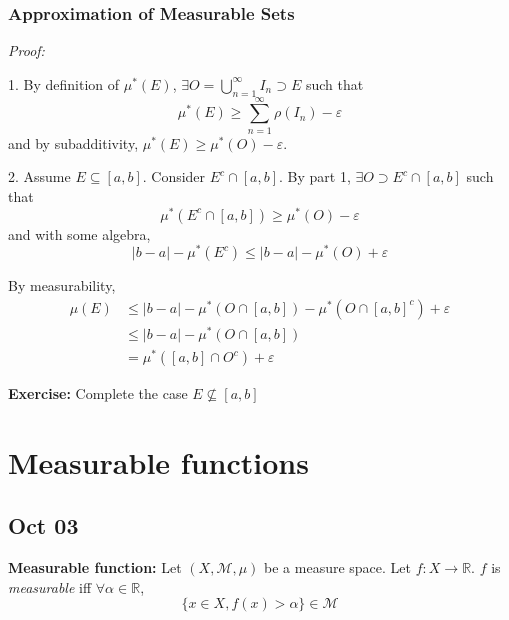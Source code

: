 \documentclass[12pt]{report}
\newcommand{\R}{\mathbb{R}}
\newcommand{\abs}[1]{\left\vert #1 \right\vert}
\newcommand{\ep}{\varepsilon}
\newcommand{\M}{\mathcal{M}}
\newcommand{\sub}{\subseteq}
\newenvironment*{tbox}[2][gray]{
    \begin{tcolorbox}[
        parbox=false,
        colback=#1!5!white,
        colframe=#1!75!black,
        breakable,
        title={#2}
    ]}
    {\end{tcolorbox}}
\newenvironment*{exercise}[1][red]{
    \begin{tcolorbox}[
        parbox=false,
        colback=#1!5!white,
        colframe=#1!75!black,
        breakable
    ]}
    {\end{tcolorbox}}
\begin{document}
\subsection*{Approximation of Measurable Sets}
    \begin{tbox}{\textbf{Lemma:} 
        \begin{enumerate}
            \item (Approximation from Above) $\forall E \sub P(X)$ and $\forall \ep > 0$, then exists an open set $O$ such that $E \sub O$ and 
            \[\mu(O) \geq \mu^*(E) \geq \mu(O) - \ep\]
            \item (Approximation from Below) $\forall E \sub \M$ and $\forall \ep > 0$, $\exists K$ closed such that 
            \[\mu(K) \leq \mu(E) \leq \mu(K) + \ep\] 
        \end{enumerate}}
        \emph{Proof:} 

        1. By definition of $\mu^*(E)$, $\exists O = \bigcup_{n=1}^\infty I_n \supset E$ such that 
        \[\mu^*(E) \geq \sum_{n=1}^{\infty} \rho(I_n) - \ep\] 
        and by subadditivity, $\mu^*(E) \geq \mu^*(O) - \ep$. 
        
        2. Assume $E \sub [a, b]$. Consider $E^c \cap [a, b]$. By part 1, $\exists O \supset E^c \cap [a, b]$ such that 
        \[\mu^*(E^c \cap [a, b]) \geq \mu^*(O) - \ep\]
        and with some algebra, 
        \[\abs{b - a} - \mu^*(E^c) \leq \abs{b - a} - \mu^*(O) + \ep\]

        By measurability, 
        \begin{align*}
            \mu(E) &\leq \abs{b - a} - \mu^*(O \cap [a, b]) - \mu^*(O \cap [a, b]^c) + \ep\\ 
            &\leq \abs{b - a} - \mu^*(O \cap [a, b])\\ 
            &= \mu^*([a, b] \cap O^c) + \ep
        \end{align*}

        \begin{exercise}
            \textbf{Exercise:} Complete the case $E \not\sub [a, b]$
        \end{exercise}
    \end{tbox}

\chapter{Measurable functions}
\section{Oct 03}
    \textbf{Measurable function:} Let $(X, \M, \mu)$ be a measure space. Let $f: X \to \R$. $f$ is \emph{measurable} iff $\forall \alpha \in \R$, 
    \[\{x \in X, f(x) > \alpha\} \in \M\] 
\end{document}
